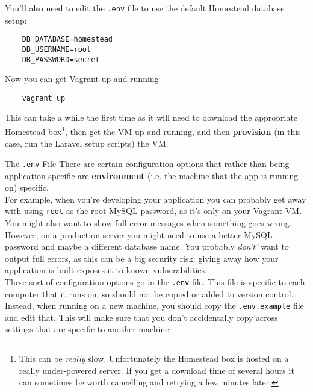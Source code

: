 You'll also need to edit the \texttt{.env} file to use the default Homestead database setup:

\begin{verbatim}
    DB_DATABASE=homestead
    DB_USERNAME=root
    DB_PASSWORD=secret
\end{verbatim}

Now you can get Vagrant up and running:

\begin{verbatim}
    vagrant up
\end{verbatim}

This can take a while the first time as it will need to download the appropriate Homestead box\footnote{This can be \textit{really} slow. Unfortunately the Homestead box is hosted on a really under-powered server. If you get a download time of several hours it can sometimes be worth cancelling and retrying a few minutes later.}, then get the VM up and running, and then \textbf{provision} (in this case, run the Laravel setup scripts) the VM.

\pagebreak

\begin{infobox}{The \texttt{.env} File}
    There are certain configuration options that rather than being application specific are \textbf{environment} (i.e. the machine that the app is running on) specific.
    \\

    For example, when you're developing your application you can probably get away with using \texttt{root} as the root MySQL password, as it's only on your Vagrant VM. You might also want to show full error messages when something goes wrong.
    \\

    However, on a production server you might need to use a better MySQL password and maybe a different database name. You probably \textit{don't'} want to output full errors, as this can be a big security risk: giving away how your application is built exposes it to known vulnerabilities.
    \\

    These sort of configuration options go in the \texttt{.env} file. This file is specific to each computer that it runs on, so should not be copied or added to version control. Instead, when running on a new machine, you should copy the \texttt{.env.example} file and edit that. This will make sure that you don't accidentally copy across settings that are specific to another machine.
\end{infobox}


